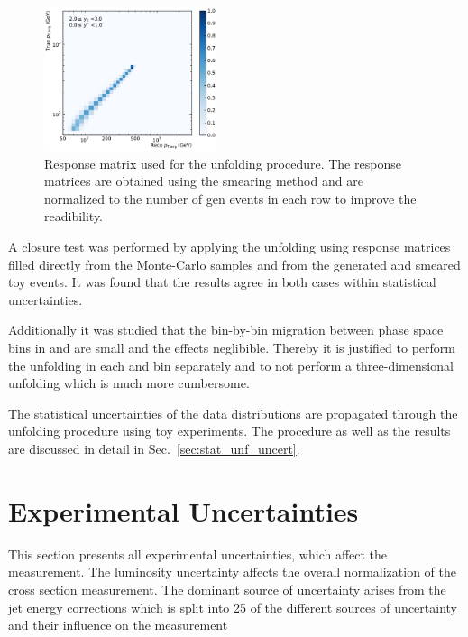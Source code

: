 \begin{figure}[htp]
    \includegraphics[width=0.45\textwidth]{figures/measurement/res_matrix_ptavg_normalized_yb2ys0.pdf}
    \caption{Response matrix used for the unfolding procedure. The response matrices are obtained
            using the smearing method and are normalized to the number of gen events in each row to improve
            the readibility.}
    \label{fig:res_matrix}
\end{figure}

A closure test was performed by applying the unfolding using response matrices
filled directly from the Monte-Carlo samples and from the generated and smeared
toy events. It was found that the results agree in both cases within statistical
uncertainties.

Additionally it was studied that the bin-by-bin migration between phase space
bins in \ystar and \yboost are small and the effects neglibible. Thereby it is
justified to perform the unfolding in each \ystar and \yboost bin separately and
to not perform a three-dimensional unfolding which is much more cumbersome.

The statistical uncertainties of the data distributions are propagated through
the unfolding procedure using toy experiments. The procedure as well as the
results are discussed in detail in Sec.~\ref{sec:stat_unf_uncert}.


\section{Experimental Uncertainties}

This section presents all experimental uncertainties, which affect the
measurement.  The luminosity uncertainty affects the
overall normalization of the cross section measurement. The dominant source of
uncertainty arises from the jet energy corrections which is split into 25
of the different sources of uncertainty and their influence on the measurement


